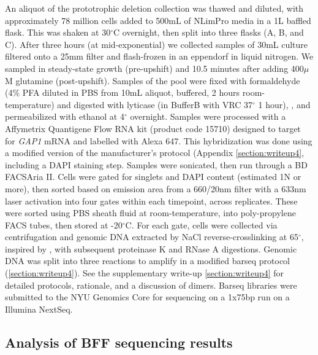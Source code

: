 {An aliquot of the prototrophic deletion collection
\parencite{vandersluis2014broad} was thawed and diluted, with 
approximately 78 million cells added to 500mL of NLimPro media 
in a 1L baffled flask. This was shaken at 30$^{\circ}$C overnight, 
then split into three flasks (A, B, and C). 
After three hours (at mid-exponential)
we collected samples of 30mL culture filtered onto a 25mm filter and
flash-frozen in an eppendorf in liquid nitrogen. 
We sampled in steady-state growth (pre-upshift) and  
10.5 minutes after adding 400$\mu$M glutamine (post-upshift).
Samples of the pool were fixed with formaldehyde
(4\% PFA diluted in PBS from 10mL aliquot, 
buffered, 2 hours room-temperature) and digested
with lyticase (in BufferB with VRC 37$^{\circ}$ 1 hour), 
\parencite{mcisaac2013visualization}, and permeabilized with ethanol at
4$^{\circ}$ overnight.
Samples were processed with a Affymetrix Quantigene Flow RNA kit 
(product code 15710) designed to target
for \textit{GAP1} mRNA and labelled with Alexa 647.
This hybridization was done using a modified
version of the manufacturer's protocol (Appendix
\autoref{section:writeup4}, including a DAPI staining step.
Samples were sonicated, then run through a BD FACSAria II.
Cells were gated for singlets and DAPI content 
(estimated 1N or more), then sorted based on emission area from a
660/20nm filter with a 633nm laser activation
into four gates within each timepoint, across replicates.
These were sorted using PBS sheath fluid at room-temperature, into
poly-propylene FACS tubes, then stored at -20$^{\circ}$C.
For each gate, cells were collected via centrifugation and genomic
DNA extracted by NaCl reverse-crosslinking at 65$^{\circ}$,
inspired by \cite{klemm2014transcriptional}, with
subsequent proteinase K and RNase A digestions.
Genomic DNA was split into three reactions to amplify in a 
modified barseq protocol (\autoref{section:writeup4}).
See the supplementary write-up \autoref{section:writeup4} for 
detailed protocols, rationale, and a discussion of dimers.
Barseq libraries were submitted to the NYU Genomics Core 
for sequencing on a 1x75bp run on a Illumina NextSeq.

\subsection{Analysis of BFF sequencing results}

}
